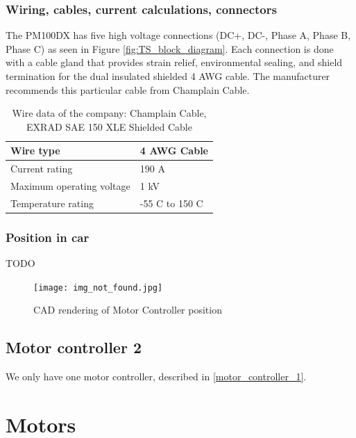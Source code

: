\documentclass{article}
\begin{document}
\subsubsection{Wiring, cables, current calculations, connectors}

The PM100DX has five high voltage connections (DC+, DC-, Phase A, Phase B, Phase C) as seen in Figure \ref{fig:TS_block_diagram}. Each connection is done with a cable gland that provides strain relief, environmental sealing, and shield termination for the dual insulated shielded 4 AWG cable. The manufacturer recommends this particular cable from Champlain Cable. 

\begin{table}[H]
	\centering
	\begin{tabular}{|l|l|}
	\hline
	Wire type & 4 AWG Cable\\ \hline
	Current rating & 190 A \\ \hline
	Maximum operating voltage & 1 kV \\ \hline
	Temperature rating & -55 \degree C to 150 \degree C \\ \hline
	\end{tabular}
	\caption{Wire data of the company: Champlain Cable, EXRAD SAE 150 XLE Shielded Cable}
	\label{motortomcwire}
\end{table}

\subsubsection{Position in car}
TODO
\begin{figure}[h]
    \centering
    \texttt{[image: img\_not\_found.jpg]}
    \caption{CAD rendering of Motor Controller position}
    \label{mc_cad}
\end{figure}

\subsection{Motor controller 2}
We only have one motor controller, described in \ref{motor_controller_1}.

\section{Motors}\label{motors}
\end{document}
